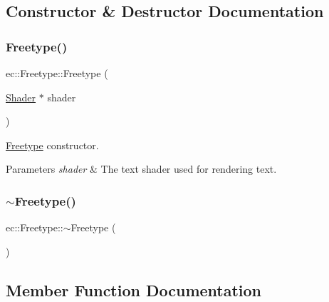 \subsection{Constructor \& Destructor Documentation}
\mbox{\label{classec_1_1_freetype_a77da5cdd8b053a5fea7c5ffd78c39418}} 
\subsubsection{\texorpdfstring{Freetype()}{Freetype()}}
{\footnotesize\ttfamily ec\+::\+Freetype\+::\+Freetype (\begin{DoxyParamCaption}\item[{\mbox{\hyperlink{classec_1_1_shader}{Shader}} $\ast$}]{shader }\end{DoxyParamCaption})\hspace{0.3cm}{\ttfamily [explicit]}}



\mbox{\hyperlink{classec_1_1_freetype}{Freetype}} constructor. 


\begin{DoxyParams}{Parameters}
{\em shader} & The text shader used for rendering text. \\
\hline
\end{DoxyParams}
\mbox{\label{classec_1_1_freetype_a35e8fad09705600cdd263ed3781d299b}} 
\subsubsection{\texorpdfstring{$\sim$\+Freetype()}{~Freetype()}}
{\footnotesize\ttfamily ec\+::\+Freetype\+::$\sim$\+Freetype (\begin{DoxyParamCaption}{ }\end{DoxyParamCaption})\hspace{0.3cm}{\ttfamily [default]}}



\subsection{Member Function Documentation}
\mbox{\label{classec_1_1_freetype_a7a10e5515342b70588f76328ac83826d}} 
